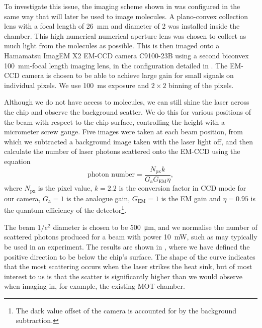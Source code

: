 To investigate this issue, the imaging scheme shown in
 was configured in the same way that will later
be used to image molecules.  A plano-convex collection lens with a focal length
of \SI{26}{\milli\meter} and diameter of \SI{2}{\inch} was installed inside the
chamber. This high numerical numerical aperture lens was chosen to collect as
much light from the molecules as possible. This is then imaged onto a Hamamatsu
ImagEM X2 EM-CCD camera C9100-23B using a second biconvex
\SI{100}{\milli\meter}-focal length imaging lens, in the configuration detailed
in . The EM-CCD camera is chosen to be able to
achieve large gain for small signals on individual pixels. We use
\SI{100}{\milli\second} exposure and $2\times2$ binning of the pixels.

Although we do not have access to molecules, we can still shine the laser
across the chip and observe the background scatter. We do this for various
positions of the beam with respect to the chip surface, controlling the height
with a micrometer screw gauge. Five images were taken at each beam position,
from which we subtracted a background image taken with the laser light off, and
then calculate the number of laser photons scattered onto the EM-CCD using the
equation
%
\begin{equation}
  \text{photon number} = \frac{N_\text{px} k}{G_\text{a}
    G_\text{EM}\eta},
\end{equation}
%
where $N_\text{px}$ is the pixel value, $k=2.2$ is the conversion factor in CCD
mode for our camera, $G_\text{a}=1$ is the analogue gain,
$G_\text{EM}=1$ is the EM gain and $\eta=0.95$ is the quantum efficiency of the
detector\footnote{The dark value offset of the camera is accounted for by the 
background subtraction.}.

The beam $1/e^2$ diameter is chosen to be \SI{500}{\micro\meter}, and we
normalise the number of scattered photons produced for a beam with power
\SI{10}{\milli\watt}, such as may typically be used in an experiment. The
results are shown in , where we have defined the
positive direction to be below the chip's surface. The shape of the curve
indicates that the most scattering occurs when the laser strikes the heat sink,
but of most interest to us is that the scatter is significantly higher than we
would observe when imaging in, for example, the existing MOT chamber.


